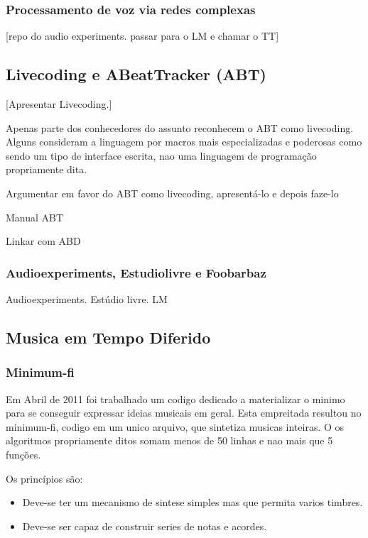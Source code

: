       \subsubsection{Processamento de voz via redes complexas}
      [repo do audio experiments. passar para o LM e chamar o TT]
  

  \subsection{Livecoding e ABeatTracker (ABT)}

  [Apresentar Livecoding.]

  Apenas parte dos conhecedores do assunto reconhecem
  o ABT como livecoding. Alguns
  consideram a linguagem por macros mais especializadas e poderosas como
  sendo um tipo de interface escrita, nao uma linguagem de programação
  propriamente dita.



  Argumentar em favor do ABT como livecoding, apresentá-lo e depois
  faze-lo 

  Manual ABT

  Linkar com ABD

      \subsubsection{Audioexperiments, Estudiolivre e Foobarbaz}

      Audioexperiments. Estúdio livre. LM




  \subsection{Musica em Tempo Diferido}

      \subsubsection{Minimum-fi}

Em Abril de 2011 foi trabalhado um codigo dedicado a materializar o minimo
para se conseguir expressar ideias musicais em geral. Esta empreitada
resultou no minimum-fi, codigo em um unico arquivo, que sintetiza
musicas inteiras. O os algoritmos propriamente ditos somam menos de
50 linhas e nao mais que 5 funções.

Os princípios são:
\begin{itemize}
  \item Deve-se ter um mecanismo de sintese simples mas que
permita varios timbres.
  \item Deve-se ser capaz de construir series de notas e acordes.
\end{itemize}

